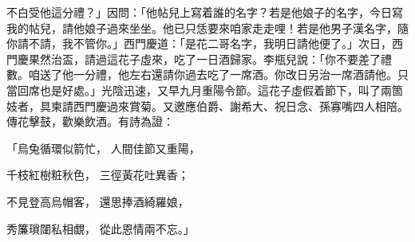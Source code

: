 不白受他這分禮？」因問：「他帖兒上寫着誰的名字？若是他娘子的名字，今日寫我的帖兒，請他娘子過來坐坐。他已只恁要來咱家走走哩！若是他男子漢名字，隨你請不請，我不管你。」西門慶道：「是花二哥名字，我明日請他便了。」次日，西門慶果然治盃，請過這花子虛來，吃了一日酒歸家。李瓶兒說：「你不要差了禮數。咱送了他一分禮，他左右還請你過去吃了一席酒。你改日另治一席酒請他。只當回席也是好處。」光陰迅速，又早九月重陽令節。這花子虛假着節下，叫了兩箇妓者，具柬請西門慶過來賞菊。又邀應伯爵、謝希大、祝日念、孫寡嘴四人相陪。傳花擊鼓，歡樂飲酒。有詩為證：

「烏兔循環似箭忙，  人間佳節又重陽，

千枝紅樹粧秋色，  三徑黃花吐異香；

不見登高烏帽客，  還思捧酒綺羅娘，

秀簾瑣闥私相覷，  從此恩情兩不忘。」

